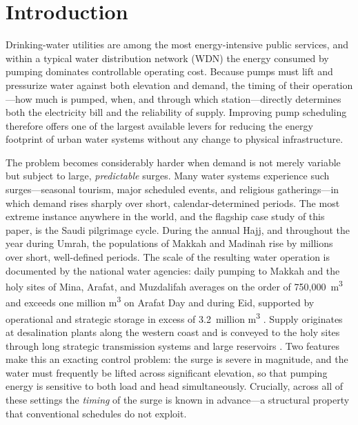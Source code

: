 \documentclass[11pt,a4paper]{article}
\begin{document}
\section{Introduction}
\label{sec:intro}

Drinking-water utilities are among the most energy-intensive public services,
and within a typical water distribution network (WDN) the energy consumed by
pumping dominates controllable operating cost. Because pumps must lift and
pressurize water against both elevation and demand, the timing of their
operation---how much is pumped, when, and through which station---directly
determines both the electricity bill and the reliability of supply. Improving
pump scheduling therefore offers one of the largest available levers for
reducing the energy footprint of urban water systems without any change to
physical infrastructure.

The problem becomes considerably harder when demand is not merely variable but
subject to large, \emph{predictable} surges. Many water systems experience such
surges---seasonal tourism, major scheduled events, and religious
gatherings---in which demand rises sharply over short, calendar-determined
periods. The most extreme instance anywhere in the world, and the flagship case
study of this paper, is the Saudi pilgrimage cycle. During the annual Hajj, and
throughout the year during Umrah, the populations of Makkah and Madinah rise by
millions over short, well-defined periods. The scale of the resulting water
operation is documented by the national water agencies: daily pumping to Makkah
and the holy sites of Mina, Arafat, and Muzdalifah averages on the order of
750{,}000~m\textsuperscript{3} and exceeds one million m\textsuperscript{3} on
Arafat Day and during Eid, supported by operational and strategic storage in
excess of 3.2~million m\textsuperscript{3} \citep{SWA2025HajjReadiness}. Supply
originates at desalination plants along the western coast and is conveyed to the
holy sites through long strategic transmission systems and large reservoirs
\citep{NWC2025Madinah}. Two features make this an exacting control problem: the
surge is severe in magnitude, and the water must frequently be lifted across
significant elevation, so that pumping energy is sensitive to both load and head
simultaneously. Crucially, across all of these settings the \emph{timing} of the
surge is known in advance---a structural property that conventional schedules do
not exploit.
\end{document}
